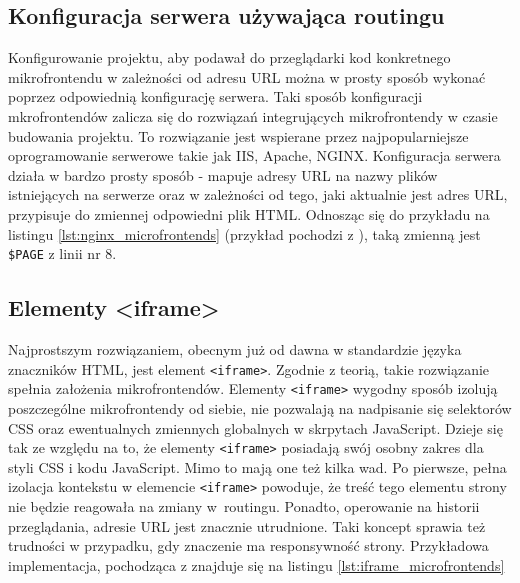 \documentclass{SGGW-thesis}
\begin{document}
{\subsection{Konfiguracja serwera używająca routingu}
Konfigurowanie projektu, aby podawał do przeglądarki kod konkretnego mikrofrontendu w zależności od adresu URL można w prosty sposób wykonać poprzez odpowiednią konfigurację serwera. Taki sposób konfiguracji mkrofrontendów zalicza się do rozwiązań integrujących mikrofrontendy w czasie budowania projektu. To rozwiązanie jest wspierane przez najpopularniejsze oprogramowanie serwerowe takie jak IIS, Apache, NGINX. Konfiguracja serwera działa w bardzo prosty sposób - mapuje adresy URL na nazwy plików istniejących na serwerze oraz w zależności od tego, jaki aktualnie jest adres URL, przypisuje do zmiennej odpowiedni plik HTML. Odnosząc się do przykładu na listingu \cref{lst:nginx_microfrontends} (przykład pochodzi z \cite{fowler_2019}), taką zmienną jest \lstinline{$PAGE} z linii nr 8.



\subsection{Elementy <iframe>}
Najprostszym rozwiązaniem, obecnym już od dawna w standardzie języka znaczników HTML, jest element \lstinline{<iframe>}. Zgodnie z teorią, takie rozwiązanie spełnia założenia mikrofrontendów. Elementy \lstinline{<iframe>} wygodny sposób izolują poszczególne mikrofrontendy od siebie, nie pozwalają na nadpisanie się selektorów CSS oraz ewentualnych zmiennych globalnych w skrpytach JavaScript. Dzieje się tak ze względu na to, że elementy \lstinline{<iframe>} posiadają swój osobny zakres dla styli CSS i kodu JavaScript. Mimo to mają one też kilka wad. Po pierwsze, pełna izolacja kontekstu w elemencie \lstinline{<iframe>} powoduje, że treść tego elementu strony nie będzie reagowała na zmiany w~routingu. Ponadto, operowanie na historii przeglądania, adresie URL jest znacznie utrudnione. Taki koncept sprawia też trudności w przypadku, gdy znaczenie ma responsywność strony. Przykładowa implementacja, pochodząca z \cite{fowler_2019} znajduje się na listingu \cref{lst:iframe_microfrontends}



}
\end{document}
